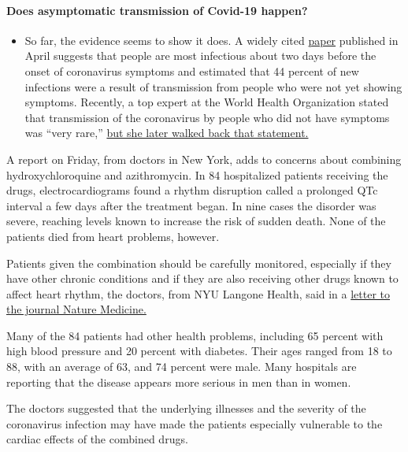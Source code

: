 \begin{itemize}
{  \paragraph{Does asymptomatic transmission of Covid-19
  happen?}\label{does-asymptomatic-transmission-of-covid-19-happen}}

  \begin{itemize}
  \tightlist
  \item
    So far, the evidence seems to show it does. A widely cited
    \href{https://www.nature.com/articles/s41591-020-0869-5}{paper}
    published in April suggests that people are most infectious about
    two days before the onset of coronavirus symptoms and estimated that
    44 percent of new infections were a result of transmission from
    people who were not yet showing symptoms. Recently, a top expert at
    the World Health Organization stated that transmission of the
    coronavirus by people who did not have symptoms was ``very rare,''
    \href{https://www.nytimes.com/2020/06/09/world/coronavirus-updates.html?action=click\&pgtype=Article\&state=default\&region=MAIN_CONTENT_3\&context=storylines_faq\#link-1f302e21}{but
    she later walked back that statement.}
  \end{itemize}
\end{itemize}

A report on Friday, from doctors in New York, adds to concerns about
combining hydroxychloroquine and azithromycin. In 84 hospitalized
patients receiving the drugs, electrocardiograms found a rhythm
disruption called a prolonged QTc interval a few days after the
treatment began. In nine cases the disorder was severe, reaching levels
known to increase the risk of sudden death. None of the patients died
from heart problems, however.

Patients given the combination should be carefully monitored, especially
if they have other chronic conditions and if they are also receiving
other drugs known to affect heart rhythm, the doctors, from NYU Langone
Health, said in a
\href{https://www.nature.com/articles/s41591-020-0888-2}{letter to the
journal Nature Medicine.}

Many of the 84 patients had other health problems, including 65 percent
with high blood pressure and 20 percent with diabetes. Their ages ranged
from 18 to 88, with an average of 63, and 74 percent were male. Many
hospitals are reporting that the disease appears more serious in men
than in women.

The doctors suggested that the underlying illnesses and the severity of
the coronavirus infection may have made the patients especially
vulnerable to the cardiac effects of the combined drugs.

